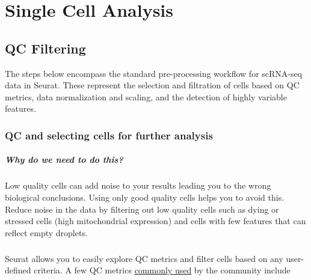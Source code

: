 \documentclass[
]{book}
\begin{document}
\hypertarget{part-single-cell-analysis}{%
\part{Single Cell Analysis}\label{part-single-cell-analysis}}

\hypertarget{qc}{%
\chapter{QC Filtering}\label{qc}}

The steps below encompass the standard pre-processing workflow for scRNA-seq data in Seurat. These represent the selection and filtration of cells based on QC metrics, data normalization and scaling, and the detection of highly variable features.

\hypertarget{qc-and-selecting-cells-for-further-analysis}{%
\section{QC and selecting cells for further analysis}\label{qc-and-selecting-cells-for-further-analysis}}

\hypertarget{why-do-we-need-to-do-this}{%
\subsubsection*{Why do we need to do this?}\label{why-do-we-need-to-do-this}}

Low quality cells can add noise to your results leading you to the wrong biological conclusions. Using only good quality cells helps you to avoid this. Reduce noise in the data by filtering out low quality cells such as dying or stressed cells (high mitochondrial expression) and cells with few features that can reflect empty droplets.

\hypertarget{section-1}{%
\subsubsection*{}\label{section-1}}

Seurat allows you to easily explore QC metrics and filter cells based on any user-defined criteria. A few QC metrics \href{https://www.ncbi.nlm.nih.gov/pmc/articles/PMC4758103/}{commonly used} by the community include
\end{document}
